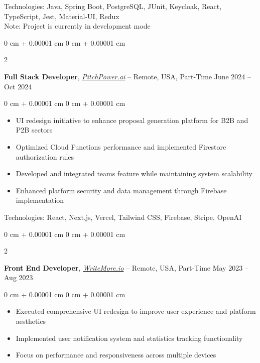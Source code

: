 \documentclass[10pt, letterpaper]{article}
\newenvironment{highlights}{
    \begin{itemize}[
        topsep=0.10 cm,
        parsep=0.10 cm,
        partopsep=0pt,
        itemsep=0pt,
        leftmargin=0 cm + 10pt
    ]
}{
    \end{itemize}
} %
\newenvironment{onecolentry}{
    \begin{adjustwidth}{
        0 cm + 0.00001 cm
    }{
        0 cm + 0.00001 cm
    }
}{
    \end{adjustwidth}
} %
\newenvironment{twocolentry}[2][]{
    \onecolentry
    \def\secondColumn{#2}
    \setcolumnwidth{\fill, 4.5 cm}
    \begin{paracol}{2}
}{
    \switchcolumn \raggedleft \secondColumn
    \end{paracol}
    \endonecolentry
} %
\let\hrefWithoutArrow\href
\begin{document}
    \vspace{0.2 cm}
    Technologies: Java, Spring Boot, PostgreSQL, JUnit, Keycloak, React, TypeScript, Jest, Material-UI, Redux \\
    \vspace{0.1 cm}
    Note: Project is currently in development mode

    \vspace{0.3 cm}
    
    \begin{twocolentry}{
        June 2024 – Oct 2024
    }
        \textbf{Full Stack Developer}, \hrefWithoutArrow{https://pitchpower.ai/}{\textit{PitchPower.ai}} -- Remote, USA, Part-Time\end{twocolentry}

    \vspace{0.20 cm}

    \begin{onecolentry}
        \begin{highlights}
            \item UI redesign initiative to enhance proposal generation platform for B2B and P2B sectors
            \item Optimized Cloud Functions performance and implemented Firestore authorization rules
            \item Developed and integrated teams feature while maintaining system scalability
            \item Enhanced platform security and data management through Firebase implementation
        \end{highlights}
    \end{onecolentry}

    \vspace{0.20 cm}
    Technologies: React, Next.js, Vercel, Tailwind CSS, Firebase, Stripe, OpenAI

    \vspace{0.3 cm}
    
    \begin{twocolentry}{
        May 2023 – Aug 2023
    }
        \textbf{Front End Developer}, \hrefWithoutArrow{https://writemore.io/}{\textit{WriteMore.io}} -- Remote, USA, Part-Time\end{twocolentry}

    \vspace{0.20 cm}

    \begin{onecolentry}
        \begin{highlights}
            \item Executed comprehensive UI redesign to improve user experience and platform aesthetics
            \item Implemented user notification system and statistics tracking functionality
            \item Focus on performance and responsiveness across multiple devices
        \end{highlights}
    \end{onecolentry}
\end{document}
